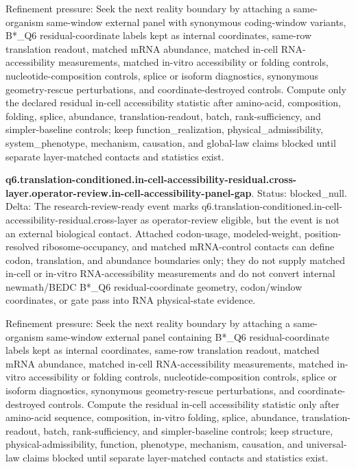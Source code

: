 Refinement pressure: Seek the next reality boundary by attaching a same-organism same-window external panel with synonymous coding-window variants, B*\_Q6 residual-coordinate labels kept as internal coordinates, same-row translation readout, matched mRNA abundance, matched in-cell RNA-accessibility measurements, matched in-vitro accessibility or folding controls, nucleotide-composition controls, splice or isoform diagnostics, synonymous geometry-rescue perturbations, and coordinate-destroyed controls. Compute only the declared residual in-cell accessibility statistic after amino-acid, composition, folding, splice, abundance, translation-readout, batch, rank-sufficiency, and simpler-baseline controls; keep function\_realization, physical\_admissibility, system\_phenotype, mechanism, causation, and global-law claims blocked until separate layer-matched contacts and statistics exist.

\textbf{q6.translation-conditioned.in-cell-accessibility-residual.cross-layer.operator-review.in-cell-accessibility-panel-gap}. Status: blocked\_null. Delta: The research-review-ready event marks q6.translation-conditioned.in-cell-accessibility-residual.cross-layer as operator-review eligible, but the event is not an external biological contact. Attached codon-usage, modeled-weight, position-resolved ribosome-occupancy, and matched mRNA-control contacts can define codon, translation, and abundance boundaries only; they do not supply matched in-cell or in-vitro RNA-accessibility measurements and do not convert internal newmath/BEDC B*\_Q6 residual-coordinate geometry, codon/window coordinates, or gate pass into RNA physical-state evidence.

Refinement pressure: Seek the next reality boundary by attaching a same-organism same-window external panel containing B*\_Q6 residual-coordinate labels kept as internal coordinates, same-row translation readout, matched mRNA abundance, matched in-cell RNA-accessibility measurements, matched in-vitro accessibility or folding controls, nucleotide-composition controls, splice or isoform diagnostics, synonymous geometry-rescue perturbations, and coordinate-destroyed controls. Compute the residual in-cell accessibility statistic only after amino-acid sequence, composition, in-vitro folding, splice, abundance, translation-readout, batch, rank-sufficiency, and simpler-baseline controls; keep structure, physical-admissibility, function, phenotype, mechanism, causation, and universal-law claims blocked until separate layer-matched contacts and statistics exist.

